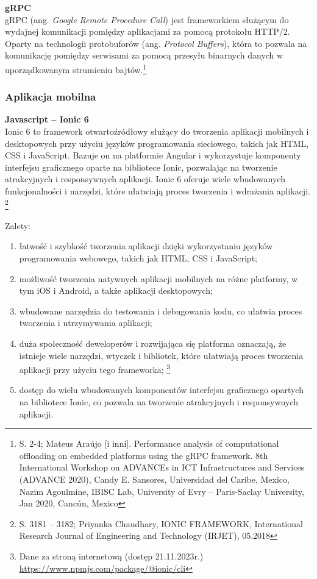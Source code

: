 \documentclass[12pt, a4paper, twoside, openany]{book}
\newcommand{\forceindent}{\leavevmode{\parindent=1.3em\indent}}
\begin{document}
\forceindent \textbf{gRPC\\}
\forceindent gRPC (ang. \textit{Google Remote Procedure Call}) jest frameworkiem służącym do wydajnej komunikacji pomiędzy aplikacjami za pomocą protokołu HTTP/2. Oparty na technologii protobuforów (ang. \textit{Protocol Buffers}), która to pozwala na komunikację pomiędzy serwisami za pomocą przesyłu binarnych danych w uporządkowanym strumieniu bajtów.\footnote{S. 2-4; Mateus Araújo [i inni]. Performance analysis of computational offloading on embedded platforms using the gRPC framework. 8th International Workshop on ADVANCEs in ICT Infrastructures and Services (ADVANCE 2020), Candy E. Sansores, Universidad del Caribe, Mexico, Nazim Agoulmine, IBISC Lab, University of Evry -- Paris-Saclay University, Jan 2020, Cancún, Mexico}

\subsubsection{Aplikacja mobilna}

\forceindent \textbf{Javascript -- Ionic 6\\}
\indent Ionic 6 to framework otwartoźródłowy służący do tworzenia aplikacji mobilnych i desktopowych przy użyciu języków programowania sieciowego, takich jak HTML, CSS i JavaScript. Bazuje on na platformie Angular i wykorzystuje komponenty interfejsu graficznego oparte na bibliotece Ionic, pozwalając na tworzenie atrakcyjnych i responsywnych aplikacji. Ionic 6 oferuje wiele wbudowanych funkcjonalności i narzędzi, które ułatwiają proces tworzenia i wdrażania aplikacji. \footnote{S. 3181 -- 3182; Priyanka Chaudhary, IONIC FRAMEWORK, International Research Journal of Engineering and Technology (IRJET), 05.2018}

Zalety:
\begin{enumerate}[label=--]
    \item łatwość i szybkość tworzenia aplikacji dzięki wykorzystaniu języków programowania webowego, takich jak HTML, CSS i JavaScript;
    \item możliwość tworzenia natywnych aplikacji mobilnych na różne platformy, w tym iOS i Android, a także aplikacji desktopowych;
    \item wbudowane narzędzia do testowania i debugowania kodu, co ułatwia proces tworzenia i utrzymywania aplikacji;
    \item duża społeczność deweloperów i rozwijająca się platforma oznaczają, że istnieje wiele narzędzi, wtyczek i bibliotek, które ułatwiają proces tworzenia aplikacji przy użyciu tego frameworka; \footnote{Dane za stroną internetową (dostęp 21.11.2023r.) \url{https://www.npmjs.com/package/@ionic/cli}}
    \item dostęp do wielu wbudowanych komponentów interfejsu graficznego opartych na bibliotece Ionic, co pozwala na tworzenie atrakcyjnych i responsywnych aplikacji.
\end{enumerate}
\end{document}
